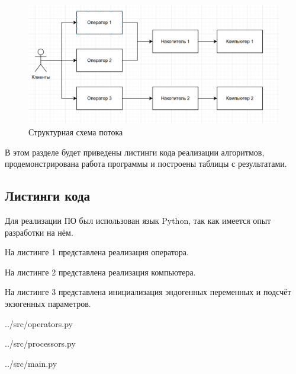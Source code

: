 \FloatBarrier
\begin{figure}[h]
	\begin{center}
		\includegraphics[width=\linewidth]{inc/flow.png}
	\end{center}
	\caption{Структурная схема потока}
\end{figure}
\FloatBarrier


В этом разделе будет приведены листинги кода реализации алгоритмов, продемонстрирована работа программы и построены таблицы с результатами.

\subsection*{Листинги кода}
Для реализации ПО был использован язык Python, так как имеется опыт разработки на нём.

На листинге 1 представлена реализация оператора.

На листинге 2 представлена реализация компьютера.

На листинге 3 представлена инициализация эндогенных переменных и подсчёт экзогенных параметров. 

\begin{lstinputlisting}[language=Python, caption=Реализация оператора, linerange={22-29}, 
	basicstyle=\footnotesize\ttfamily, frame=single,breaklines=true]{../src/operators.py}
\end{lstinputlisting}
\FloatBarrier

\FloatBarrier
\begin{lstinputlisting}[language=Python, caption=Реализация компьютера, linerange={14-24}, 
	basicstyle=\footnotesize\ttfamily, frame=single, breaklines=true]{../src/processors.py}
\end{lstinputlisting}
\FloatBarrier

\newpage

\FloatBarrier
\begin{lstinputlisting}[language=Python, caption=Инициализация эндогенных переменных и подсчёт экзогенных параметров, linerange={5-17}, basicstyle=\footnotesize\ttfamily, frame=single, breaklines=true]{../src/main.py}
\end{lstinputlisting}
\FloatBarrier


